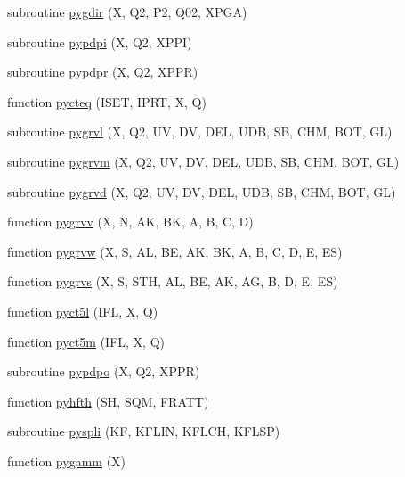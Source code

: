 \begin{DoxyCompactItemize}
\item 
subroutine \hyperlink{pythia-6_84_824_8f_ae6cda6b3b8fc088943d6e62ea2b46fa3}{pygdir} (X, Q2, P2, Q02, X\+P\+GA)
\item 
subroutine \hyperlink{pythia-6_84_824_8f_a531404f3c78f1a46663578aced4e7949}{pypdpi} (X, Q2, X\+P\+PI)
\item 
subroutine \hyperlink{pythia-6_84_824_8f_a50867d0838ac3bac097f6b5ebad0367e}{pypdpr} (X, Q2, X\+P\+PR)
\item 
function \hyperlink{pythia-6_84_824_8f_ac6605825fa66747684fd87ed3dd04c29}{pycteq} (I\+S\+ET, I\+P\+RT, X, Q)
\item 
subroutine \hyperlink{pythia-6_84_824_8f_a9536da5c1a25003eb2b4660ee140aae3}{pygrvl} (X, Q2, UV, DV, D\+EL, U\+DB, SB, C\+HM, B\+OT, GL)
\item 
subroutine \hyperlink{pythia-6_84_824_8f_a74cd930f8d1b849e1d3411d2a0f7513a}{pygrvm} (X, Q2, UV, DV, D\+EL, U\+DB, SB, C\+HM, B\+OT, GL)
\item 
subroutine \hyperlink{pythia-6_84_824_8f_a09a7ba7614c769f663607fa14028547f}{pygrvd} (X, Q2, UV, DV, D\+EL, U\+DB, SB, C\+HM, B\+OT, GL)
\item 
function \hyperlink{pythia-6_84_824_8f_aa24b26bd99e9077506224df51d31969a}{pygrvv} (X, N, AK, BK, A, B, C, D)
\item 
function \hyperlink{pythia-6_84_824_8f_a62fd74a25057f05b80687923b03c660e}{pygrvw} (X, S, AL, BE, AK, BK, A, B, C, D, E, ES)
\item 
function \hyperlink{pythia-6_84_824_8f_a3d0f3f88ce64951c60d9af8b21bd67a6}{pygrvs} (X, S, S\+TH, AL, BE, AK, AG, B, D, E, ES)
\item 
function \hyperlink{pythia-6_84_824_8f_a4f37f9344270ad52d136ebb5a849ad4e}{pyct5l} (I\+FL, X, Q)
\item 
function \hyperlink{pythia-6_84_824_8f_a3ad7f72b08000107702cb296d607a0b9}{pyct5m} (I\+FL, X, Q)
\item 
subroutine \hyperlink{pythia-6_84_824_8f_a605143159514e85a1ef178afc6ce14fc}{pypdpo} (X, Q2, X\+P\+PR)
\item 
function \hyperlink{pythia-6_84_824_8f_a9963904e560eddd173e584b94c1651a1}{pyhfth} (SH, S\+QM, F\+R\+A\+TT)
\item 
subroutine \hyperlink{pythia-6_84_824_8f_aab7673bb913ff8040b3daca173253fd3}{pyspli} (KF, K\+F\+L\+IN, K\+F\+L\+CH, K\+F\+L\+SP)
\item 
function \hyperlink{pythia-6_84_824_8f_a06d78ee8406e4a1ebe6e3704ba3d4ee0}{pygamm} (X)
\item 

\end{DoxyCompactItemize}
